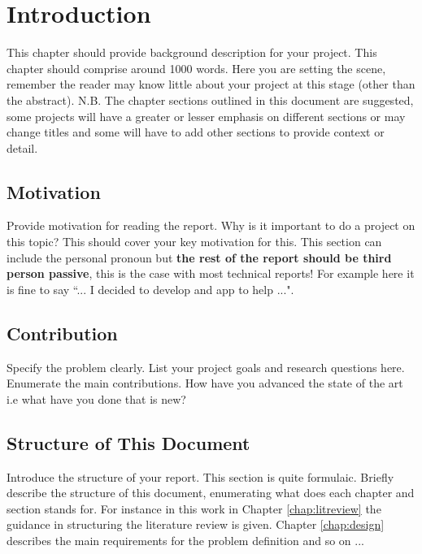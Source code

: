 \chapter{Introduction}
\label{chap:intro}

This chapter should provide background description for your project. This chapter should comprise around 1000 words. Here you are setting the scene, remember the reader may know little about your project at this stage (other than the abstract). N.B. The chapter sections outlined in this document are suggested, some projects will have a greater or lesser emphasis on different sections or may change titles and some will have to add other sections to provide context or detail.

\section{Motivation}
Provide motivation for reading the report. Why is it important to do a project on this topic? This should cover your key motivation for this. This section can include the personal pronoun but \textbf{the rest of the report should be third person passive}, this is the case with most technical reports! For example here it is fine to say ``... I decided to develop and app to help ...".

\section{Contribution}
Specify the problem clearly. List your project goals and research questions here. Enumerate the main contributions. How have you advanced the state of the art i.e what have you done that is new?

\section{Structure of This Document}
Introduce the structure of your report. This section is quite formulaic. Briefly describe the structure of this document, enumerating what does each chapter and section stands for. For instance in this work in Chapter \ref{chap:litreview} the guidance in structuring the literature review is given. Chapter \ref{chap:design} describes the main requirements for the problem definition and so on ...